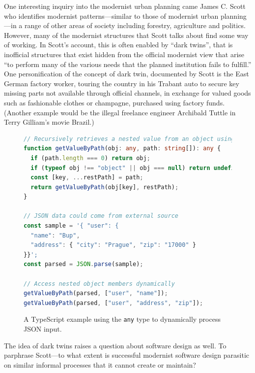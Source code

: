 One interesting inquiry into the modernist urban planning came James C. Scott who identifies
modernist patterns---similar to those of modernist urban planning---in a range of other
areas of society including forestry, agriculture and politics. However, many of the modernist
structures that Scott talks about find some way of working. In Scott's account, this is often
enabled by ``dark twins'', that is inofficial structures that exist hidden from the official
modernist view that arise ``to perform many of the various needs that the planned institution
fails to fulfill.'' One personification of the concept of dark twin,
documented by Scott is the East German factory worker, touring the country in his Trabant
auto to secure key missing parts not available through official channels, in exchange for
valued goods such as fashionable clothes or champagne, purchased using factory funds.
(Another example would be the illegal freelance engineer Archibald Tuttle in Terry Gilliam's
movie Brazil.)


\begin{figure}
\begin{lstlisting}[language=ts]
// Recursively retrieves a nested value from an object using a path
function getValueByPath(obj: any, path: string[]): any {
  if (path.length === 0) return obj;
  if (typeof obj !== "object" || obj === null) return undefined;
  const [key, ...restPath] = path;
  return getValueByPath(obj[key], restPath);
}

// JSON data could come from external source
const sample = '{ "user": {
  "name": "Bup",
  "address": { "city": "Prague", "zip": "17000" }
}}';
const parsed = JSON.parse(sample);

// Access nested object members dynamically
getValueByPath(parsed, ["user", "name"]);
getValueByPath(parsed, ["user", "address", "zip"]);
\end{lstlisting}
\caption{A TypeScript example using the \texttt{any} type to dynamically process JSON input.}
\label{fig:any}
\end{figure}

The idea of dark twins raises a question about software design as well. To parphrase Scott---to
what extent is successful modernist software design parasitic on similar informal processes that
it cannot create or maintain?

